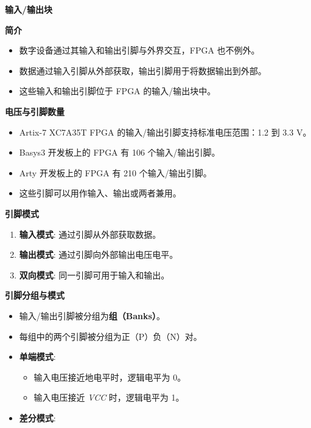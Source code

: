 \begin{frame}[allowframebreaks]{\textbf{输入/输出块}}
\begin{block}{\textbf{简介}}
\begin{itemize}
\tightlist
\item
    数字设备通过其输入和输出引脚与外界交互，FPGA 也不例外。
\item
    数据通过输入引脚从外部获取，输出引脚用于将数据输出到外部。
\item
    这些输入和输出引脚位于 FPGA 的输入/输出块中。
\end{itemize}
\end{block}

\begin{block}{\textbf{电压与引脚数量}}
\begin{itemize}
\tightlist
\item
    Artix-7 XC7A35T FPGA 的输入/输出引脚支持标准电压范围：1.2 到 3.3 V。
\item
    Basys3 开发板上的 FPGA 有 106 个输入/输出引脚。
\item
    Arty 开发板上的 FPGA 有 210 个输入/输出引脚。
\item
    这些引脚可以用作输入、输出或两者兼用。
\end{itemize}
\end{block}

\begin{block}{\textbf{引脚模式}}
\begin{enumerate}
\tightlist
\item
    \textbf{输入模式}: 通过引脚从外部获取数据。
\item
    \textbf{输出模式}: 通过引脚向外部输出电压电平。
\item
    \textbf{双向模式}: 同一引脚可用于输入和输出。
\end{enumerate}
\end{block}

\begin{block}{\textbf{引脚分组与模式}}
\begin{itemize}
\tightlist
\item
    输入/输出引脚被分组为\textbf{组（Banks）}。
\item
    每组中的两个引脚被分组为正（P）负（N）对。
\item
    \textbf{单端模式}:

    \begin{itemize}
    \tightlist
    \item
    输入电压接近地电平时，逻辑电平为 0。
    \item
    输入电压接近 \emph{VCC} 时，逻辑电平为 1。
    \end{itemize}
\item
    \textbf{差分模式}:


\end{itemize}
\end{block}
\end{frame}

